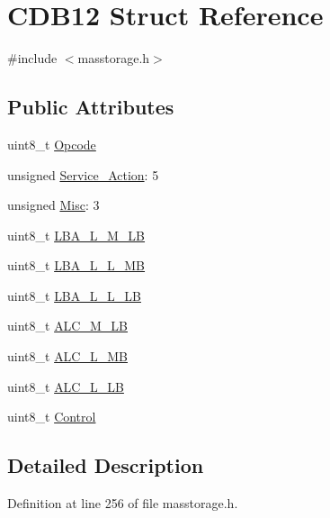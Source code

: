 \hypertarget{struct_c_d_b12}{\section{\-C\-D\-B12 \-Struct \-Reference}
\label{struct_c_d_b12}
}


{\ttfamily \#include $<$masstorage.\-h$>$}

\subsection*{\-Public \-Attributes}
\begin{DoxyCompactItemize}
\item 
uint8\-\_\-t \hyperlink{struct_c_d_b12_a75c7fb542c6c0ad6ba4a0e95a49ba1e1}{\-Opcode}
\item 
unsigned \hyperlink{struct_c_d_b12_a7d9153a24a41f0432b1467b39d1d5238}{\-Service\-\_\-\-Action}\-: 5
\item 
unsigned \hyperlink{struct_c_d_b12_af59803ec81c006b7bdefc03d80579d07}{\-Misc}\-: 3
\item 
uint8\-\_\-t \hyperlink{struct_c_d_b12_a6fb44effe62ecb8ec0de742b836fe194}{\-L\-B\-A\-\_\-\-L\-\_\-\-M\-\_\-\-L\-B}
\item 
uint8\-\_\-t \hyperlink{struct_c_d_b12_a40bc765adf21818c3a1bc3c8ffeabc94}{\-L\-B\-A\-\_\-\-L\-\_\-\-L\-\_\-\-M\-B}
\item 
uint8\-\_\-t \hyperlink{struct_c_d_b12_aa95a1e5187a93f331b34c5aaf05e0cf6}{\-L\-B\-A\-\_\-\-L\-\_\-\-L\-\_\-\-L\-B}
\item 
uint8\-\_\-t \hyperlink{struct_c_d_b12_a4ff6f2492ed55afa147edeb4605e6c06}{\-A\-L\-C\-\_\-\-M\-\_\-\-L\-B}
\item 
uint8\-\_\-t \hyperlink{struct_c_d_b12_a02594e3177ddf6fbc85b11182a00e686}{\-A\-L\-C\-\_\-\-L\-\_\-\-M\-B}
\item 
uint8\-\_\-t \hyperlink{struct_c_d_b12_a20b3adfe30452dfcb15466097223dc96}{\-A\-L\-C\-\_\-\-L\-\_\-\-L\-B}
\item 
uint8\-\_\-t \hyperlink{struct_c_d_b12_a1478895d17ea1ba1e2a70f5f5904e0b7}{\-Control}
\end{DoxyCompactItemize}


\subsection{\-Detailed \-Description}


\-Definition at line 256 of file masstorage.\-h.



